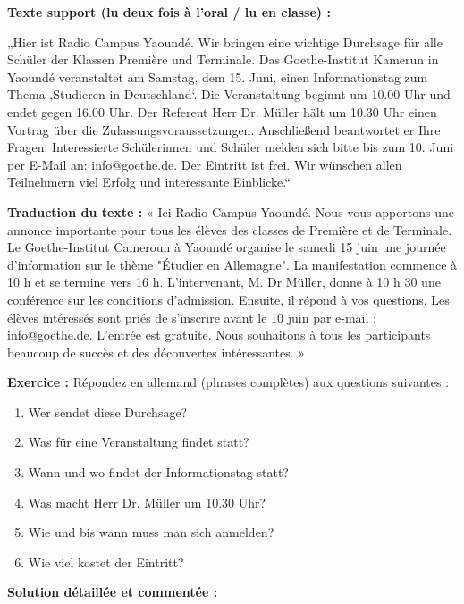 \documentclass[11pt]{article}
\begin{document}
\begin{exoresolu}
\textbf{Texte support (lu deux fois à l'oral / lu en classe) :}
\begin{textebox}
„Hier ist Radio Campus Yaoundé. Wir bringen eine wichtige Durchsage für alle Schüler der Klassen Première und Terminale. Das Goethe-Institut Kamerun in Yaoundé veranstaltet am Samstag, dem 15. Juni, einen Informationstag zum Thema ‚Studieren in Deutschland‘. Die Veranstaltung beginnt um 10.00 Uhr und endet gegen 16.00 Uhr. Der Referent Herr Dr. Müller hält um 10.30 Uhr einen Vortrag über die Zulassungsvoraussetzungen. Anschließend beantwortet er Ihre Fragen. Interessierte Schülerinnen und Schüler melden sich bitte bis zum 10. Juni per E-Mail an: info@goethe.de. Der Eintritt ist frei. Wir wünschen allen Teilnehmern viel Erfolg und interessante Einblicke.“
\end{textebox}

\textbf{Traduction du texte :} « Ici Radio Campus Yaoundé. Nous vous apportons une annonce importante pour tous les élèves des classes de Première et de Terminale. Le Goethe-Institut Cameroun à Yaoundé organise le samedi 15 juin une journée d'information sur le thème "Étudier en Allemagne". La manifestation commence à 10 h et se termine vers 16 h. L'intervenant, M. Dr Müller, donne à 10 h 30 une conférence sur les conditions d'admission. Ensuite, il répond à vos questions. Les élèves intéressés sont priés de s'inscrire avant le 10 juin par e-mail : info@goethe.de. L'entrée est gratuite. Nous souhaitons à tous les participants beaucoup de succès et des découvertes intéressantes. »

\textbf{Exercice :} Répondez en allemand (phrases complètes) aux questions suivantes :
\begin{enumerate}
    \item Wer sendet diese Durchsage?
    \item Was für eine Veranstaltung findet statt?
    \item Wann und wo findet der Informationstag statt?
    \item Was macht Herr Dr. Müller um 10.30 Uhr?
    \item Wie und bis wann muss man sich anmelden?
    \item Wie viel kostet der Eintritt?
\end{enumerate}

\tcblower
\textbf{Solution détaillée et commentée :}


\end{exoresolu}
\end{document}
